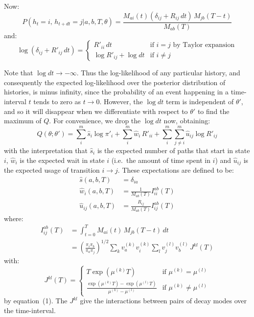 \documentclass[12pt]{article}
\begin{document}
Now:
\[
P(h_t = i,\, h_{t+dt} = j | a, b, T, \theta) = \frac{M_{ai}(t)(\delta_{ij} + R_{ij}\,dt)\, M_{jb}(T-t)}{M_{ab}(T)}
\]
and:
\[
\log(\delta_{ij} + R'_{ij}\,dt) = \begin{cases}
R'_{ii}\,dt & \text{if } i = j \text{ by Taylor expansion} \\
\log R'_{ij} + \log dt & \text{if } i \neq j
\end{cases}
\]

Note that $\log dt \to -\infty$. Thus the log-likelihood of any particular history, and consequently
the expected log-likelihood over the posterior distribution of histories, is minus infinity, since
the probability of an event happening in a time-interval $t$ tends to zero as $t \to 0$. However,
the $\log dt$ term is independent of $\theta'$, and so it will disappear when we differentiate with
respect to $\theta'$ to find the maximum of $Q$. For convenience, we drop the $\log dt$ now,
obtaining:
\begin{equation}
Q(\theta; \theta') = \sum_{i}^{m} \hat{s}_i \log \pi'_i + \sum_{i}^{m} \hat{w}_i\, R'_{ii} + \sum_{i}^{m} \sum_{j \neq i}^{m} \hat{u}_{ij} \log R'_{ij}
\end{equation}
with the interpretation that $\hat{s}_i$ is the expected number of paths that start in state $i$,
$\hat{w}_i$ is the expected wait in state $i$ (i.e.\ the amount of time spent in $i$) and
$\hat{u}_{ij}$ is the expected usage of transition $i \to j$. These expectations are defined to be:
\begin{equation}
\begin{aligned}
\hat{s}(a, b, T) &= \delta_{ia} \\
\hat{w}_i(a, b, T) &= \frac{1}{M_{ab}(T)} I^{ab}_{ii}(T) \\
\hat{u}_{ij}(a, b, T) &= \frac{R_{ij}}{M_{ab}(T)} I^{ab}_{ij}(T)
\end{aligned}
\end{equation}
where:
\begin{align*}
I^{ab}_{ij}(T) &= \int_{t=0}^{T} M_{ai}(t)\, M_{jb}(T - t)\, dt \\
&= \left(\frac{\pi_i \pi_b}{\pi_a \pi_j}\right)^{1/2} \sum_k v_a^{(k)} v_i^{(k)} \sum_l v_j^{(l)} v_b^{(l)}\, J^{kl}(T)
\end{align*}
with:
\[
J^{kl}(T) = \begin{cases}
T \exp(\mu^{(k)} T) & \text{if } \mu^{(k)} = \mu^{(l)} \\[4pt]
\displaystyle\frac{\exp(\mu^{(k)} T) - \exp(\mu^{(l)} T)}{\mu^{(k)} - \mu^{(l)}} & \text{if } \mu^{(k)} \neq \mu^{(l)}
\end{cases}
\]
by equation~(1). The $J^{kl}$ give the interactions between pairs of decay modes over the time-interval.
\end{document}
